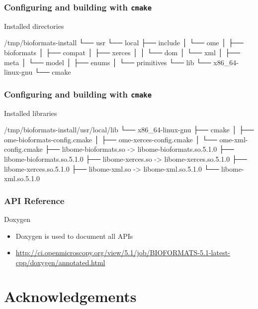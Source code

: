 \documentclass{beamer}
\begin{document}
\begin{frame}[fragile]
  \frametitle{Configuring and building with \texttt{cmake}}
\begin{block}{Installed directories}
  \begin{semiverbatim}\tiny
/tmp/bioformats-install
└── usr
    └── local
        ├── include
        │   └── ome
        │       ├── bioformats
        │       ├── compat
        │       ├── xerces
        │       │   └── dom
        │       └── xml
        │           ├── meta
        │           └── model
        │               ├── enums
        │               └── primitives
        └── lib
            └── x86_64-linux-gnu
                └── cmake
\end{semiverbatim}
\end{block}
\end{frame}

\begin{frame}[fragile]
  \frametitle{Configuring and building with \texttt{cmake}}
\begin{block}{Installed libraries}
  \begin{semiverbatim}\scriptsize
/tmp/bioformats-install/usr/local/lib
└── x86_64-linux-gnu
    ├── cmake
    │   ├── ome-bioformats-config.cmake
    │   ├── ome-xerces-config.cmake
    │   └── ome-xml-config.cmake
    ├── libome-bioformats.so -> libome-bioformats.so.5.1.0
    ├── libome-bioformats.so.5.1.0
    ├── libome-xerces.so -> libome-xerces.so.5.1.0
    ├── libome-xerces.so.5.1.0
    ├── libome-xml.so -> libome-xml.so.5.1.0
    └── libome-xml.so.5.1.0
\end{semiverbatim}
\end{block}
\end{frame}

\begin{frame}[fragile]
  \frametitle{API Reference}
\begin{block}{Doxygen}
  \begin{itemize}
  \item Doxygen is used to document all APIs
    \item \url{http://ci.openmicroscopy.org/view/5.1/job/BIOFORMATS-5.1-latest-cpp/doxygen/annotated.html}
  \end{itemize}
\end{block}
\end{frame}

\section{Acknowledgements}
\end{document}
